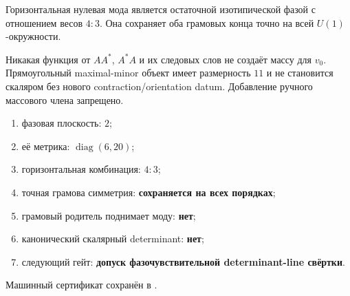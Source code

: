 \begin{theorem}
Горизонтальная нулевая мода является остаточной изотипической фазой с
отношением весов $4:3$. Она сохраняет оба грамовых конца точно на всей
$U(1)$-окружности.
\end{theorem}

\begin{nogocriterion}
Никакая функция от $A A^*$, $A^*A$ и их следовых слов не создаёт массу
для $v_0$. Прямоугольный maximal-minor объект имеет размерность $11$ и не
становится скаляром без нового contraction/orientation datum. Добавление
ручного массового члена запрещено.
\end{nogocriterion}

\begin{protocol}
\begin{enumerate}
 \item фазовая плоскость: \textbf{$2$};
 \item её метрика: \textbf{$\operatorname{diag}(6,20)$};
 \item горизонтальная комбинация: \textbf{$4:3$};
 \item точная грамова симметрия: \textbf{сохраняется на всех порядках};
 \item грамовый родитель поднимает моду: \textbf{нет};
 \item канонический скалярный determinant: \textbf{нет};
 \item следующий гейт: \textbf{допуск фазочувствительной determinant-line
 свёртки}.
\end{enumerate}
\end{protocol}

Машинный сертификат сохранён в
.